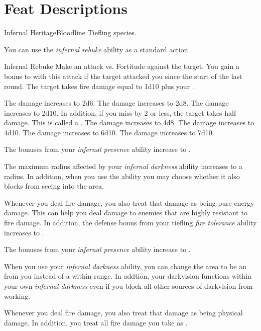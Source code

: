     \section{Feat Descriptions}

    \begin{feat}{Infernal Heritage}{Bloodline}
        \featpre Tiefling species.

         You can use the \textit{infernal rebuke} ability as a standard action.
        \begin{freeability}{Infernal Rebuke}
            Make an attack vs. Fortitude against the target.
            You gain a  bonus to  with this attack if the target attacked you since the start of the last round.
            \hit The target takes fire damage equal to 1d10 plus your .

            \rankline
             The damage increases to 2d6.
             The damage increases to 2d8.
             The damage increases to 2d10.
                In addition, if you miss by 2 or less, the target takes half damage.
                This is called a .
             The damage increases to 4d8.
             The damage increases to 4d10.
             The damage increases to 6d10.
             The damage increases to 7d10.
        \end{freeability}

         The bonuses from your \textit{infernal presence} ability increase to .

         The maximum radius affected by your \textit{infernal darkness} ability increases to a \arealarge radius.
        In addition, when you use the ability you may choose whether it also blocks  from seeing into the area.

         Whenever you deal fire damage, you also treat that damage as being pure energy damage.
        This can help you deal damage to enemies that are highly resistant to fire damage.
        In addition, the defense bonus from your tiefling \textit{fire tolerance} ability increases to .

         The bonuses from your \textit{infernal presence} ability increase to .

         When you use your \textit{infernal darkness} ability, you can change the area to be an  from you instead of a  within range.
        In addtion, your darkvision functions within your own \textit{infernal darkness} even if you block all other sources of darkvision from working.

         Whenever you deal fire damage, you also treat that damage as being physical damage.
        In addition, you treat all fire damage you take as .
    \end{feat}

